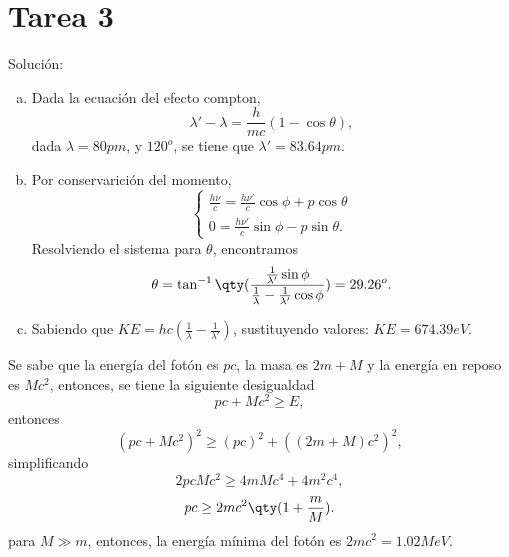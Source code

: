 \section*{Tarea 3}
\begin{mdframed}[style=warning]
	\begin{ejercicio}
		Solución:
		\begin{enumerate}[a)]
			\item Dada la ecuación del efecto compton,
				$$ \lambda ' - \lambda = \frac{h}{mc} (1-\cos{\theta}), $$
				dada $\lambda = 80pm$, y $120^o$, se tiene que $\lambda ' = 83.64pm $.
			\item Por conservarición del momento, 
				$$ \left\{\begin{array}{c}
						\frac{h\nu}{c} = \frac{h\nu '}{c} \cos{\phi} + p\cos{\theta} \\
						0 = \frac{h\nu '}{c} \sin{\phi} - p\sin{\theta}.
					\end{array}\right. $$
				Resolviendo el sistema para $\theta$, encontramos
					$$ \theta = \tan ^{-1} {\qty( \frac{\frac{1}{\lambda '} \sin{\phi}}{\frac{1}{\lambda} - \frac{1}{\lambda '} \cos{\phi}} )} = 29.26^o .$$
			\item Sabiendo que $KE = hc (\frac{1}{\lambda} - \frac{1}{\lambda '})$, sustituyendo valores: $KE = 674.39eV$.
		\end{enumerate}
	\end{ejercicio}
\end{mdframed}


\begin{mdframed}[style=warning]
	\begin{ejercicio}
		Se sabe que la energía del fotón es $pc$, la masa es $2m + M$ y la energía en reposo es $Mc^2$, entonces, se tiene la siguiente desigualdad
			$$ pc + Mc^2 \geq E, $$
		entonces
			$$ (pc + Mc^2)^2 \geq (pc)^2 + ((2m + M)c^2)^2, $$
		simplificando
			$$ 2pcMc^2 \geq 4mMc^4 + 4m^2 c^4, $$
			$$ pc \geq 2mc^2 \qty(1 + \frac{m}{M}). $$
		para $M\gg m$, entonces, la energía mínima del fotón es $2mc^2 = 1.02MeV$.
	\end{ejercicio}
\end{mdframed}
